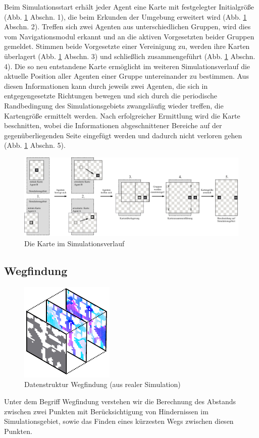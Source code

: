 \documentclass[runningheads]{llncs}
\begin{document}
	Beim Simulationsstart erhält jeder Agent eine Karte mit festgelegter Initialgröße (Abb. \ref{Karte} Abschn. 1), die beim Erkunden der Umgebung erweitert wird (Abb. \ref{Karte} Abschn. 2). Treffen sich zwei Agenten aus unterschiedlichen Gruppen, wird dies vom Navigationsmodul erkannt und an die aktiven Vorgesetzten beider Gruppen gemeldet. Stimmen beide Vorgesetzte einer Vereinigung zu, werden ihre Karten überlagert (Abb. \ref{Karte} Abschn. 3) und schließlich zusammengeführt (Abb. \ref{Karte} Abschn. 4). Die so neu entstandene Karte ermöglicht im weiteren Simulationsverlauf die aktuelle Position aller Agenten einer Gruppe untereinander zu bestimmen. Aus diesen Informationen kann durch jeweils zwei Agenten, die sich in entgegengesetzte Richtungen bewegen und sich durch die periodische Randbedingung \cite{Bungartz2013} des Simulationsgebiets zwangsläufig wieder treffen, die Kartengröße ermittelt werden. Nach erfolgreicher Ermittlung wird die Karte beschnitten, wobei die Informationen abgeschnittener Bereiche auf der gegenüberliegenden Seite eingefügt werden und dadurch nicht verloren gehen (Abb. \ref{Karte} Abschn. 5).
	\vspace{-3mm}
	\begin{figure}[h]
		\center	
		\includegraphics[scale=0.76]{./Referenzen/Kartenmerge.pdf}
		\caption{Die Karte im Simulationsverlauf}
		\label{Karte}
	\end{figure}
	
	\vspace{-8mm}
	\subsection{Wegfindung}\label{wegfindung}
	\begin{figure}
		\vspace{-8mm}
		\includegraphics{./Referenzen/Pathfinding.pdf}
		\caption{Datenstruktur Wegfindung (aus realer Simulation)}
		\label{pathfinding}
	\end{figure}
	Unter dem Begriff Wegfindung verstehen wir die Berechnung des Abstands zwischen zwei Punkten mit Berücksichtigung von Hindernissen im Simulationsgebiet, sowie das Finden eines kürzesten Wegs zwischen diesen Punkten.
	
\end{document}
